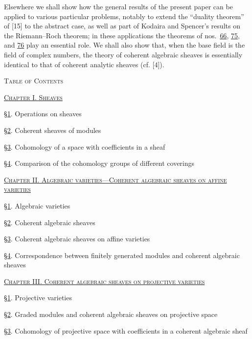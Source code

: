 Elsewhere we shall show how the general results of the present paper can be applied to various particular problems, notably to extend the ``duality theorem'' of [15] to the abstract case, as well as part of Kodaira and Spencer's results on the Riemann--Roch theorem; in these applications the theorems of nos.~\hyperref[fac:III:3:no:66]{66}, \hyperref[fac:III:5:no:75]{75}, and \hyperref[fac:III:5:no:76]{76} play an essential role. We shall also show that, when the base field is the field of complex numbers, the theory of coherent algebraic sheaves is essentially identical to that of coherent analytic sheaves (cf. [4]).

\begin{center}
\textsc{Table of Contents}
\end{center}

\noindent\hyperref[fac:I]{\textsc{Chapter I. Sheaves}}

\noindent\hyperref[fac:I:1]{\S1}. Operations on sheaves

\noindent\hyperref[fac:I:2]{\S2}. Coherent sheaves of modules

\noindent\hyperref[fac:I:3]{\S3}. Cohomology of a space with coefficients in a sheaf

\noindent\hyperref[fac:I:4]{\S4}. Comparison of the cohomology groups of different coverings

\medskip
\noindent\hyperref[fac:II]{\textsc{Chapter II. Algebraic varieties---Coherent algebraic sheaves on affine varieties}}

\noindent\hyperref[fac:II:1]{\S1}. Algebraic varieties

\noindent\hyperref[fac:II:2]{\S2}. Coherent algebraic sheaves

\noindent\hyperref[fac:II:3]{\S3}. Coherent algebraic sheaves on affine varieties

\noindent\hyperref[fac:II:4]{\S4}. Correspondence between finitely generated modules and coherent algebraic sheaves

\medskip
\noindent\hyperref[fac:III]{\textsc{Chapter III. Coherent algebraic sheaves on projective varieties}}

\noindent\hyperref[fac:III:1]{\S1}. Projective varieties

\noindent\hyperref[fac:III:2]{\S2}. Graded modules and coherent algebraic sheaves on projective space

\noindent\hyperref[fac:III:3]{\S3}. Cohomology of projective space with coefficients in a coherent algebraic sheaf

